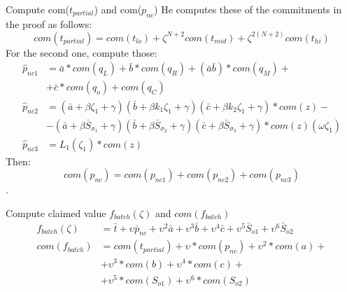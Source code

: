 \documentclass{zkdl-presentation-template}
\begin{document}
    \begin{frame} {Compute com($t_{partial}$) and com($p_{nc}$)}
        He computes these of the commitments in the proof as follows:
        \[com(t_{partial}) = com(t_{lo}) + \zeta^{N+2}com(t_{mid}) + \zeta^{2(N+2)}com(t_{hi})\]
        For the second one, compute those:
        \begin{align*}
            \hat{p}_{nc1} &= \bar{a} * com(q_L) + \bar{b} * com(q_R) + (\bar{a}\bar{b}) * com(q_M) +  \\
                        &+ \bar{c} * com(q_o) + com(q_C) \\
            \hat{p}_{nc2} &= (\bar{a} + \beta \zeta_1 + \gamma)(\bar{b} + \beta k_1 \zeta_1 + \gamma)(\bar{c} + \beta k_2 \zeta_1 + \gamma) * com(z) - \\ 
            &- (\bar{a} + \beta \bar{S}_{\sigma_1} + \gamma)(\bar{b} + \beta \bar{S}_{\sigma_2} + \gamma)(\bar{c} + \beta \bar{S}_{\sigma_3} + \gamma) * com(z)(\omega \zeta_1) \\
            \hat{p}_{nc3} &= L_1(\zeta_1) * com(z)
        \end{align*}
        Then: \[com(p_{nc}) = com(p_{nc1}) + com(p_{nc2}) + com(p_{nc3})\].
    \end{frame}

    \begin{frame} {Compute claimed value $f_{batch}(\zeta)$ and $com(f_{batch})$}
        \begin{align*}
            f_{batch}(\zeta) &= \bar{t} + \upsilon \bar{p}_{nc} + \upsilon^2 \bar{a} + \upsilon^3 \bar{b} + \upsilon^4 \bar{c} + \upsilon^5 \bar{S}_{o1} + \upsilon^6 \bar{S}_{o2} \\
            com(f_{batch}) &= com(t_{partial}) + \upsilon * com(p_{nc}) + \upsilon^2 * com(a) + \\
            &+ \upsilon^3 * com(b) + \upsilon^4 * com(c) + \\
            &+ \upsilon^5 * com(S_{o1}) + \upsilon^6 * com(S_{o2})
        \end{align*}
    \end{frame}
\end{document}

